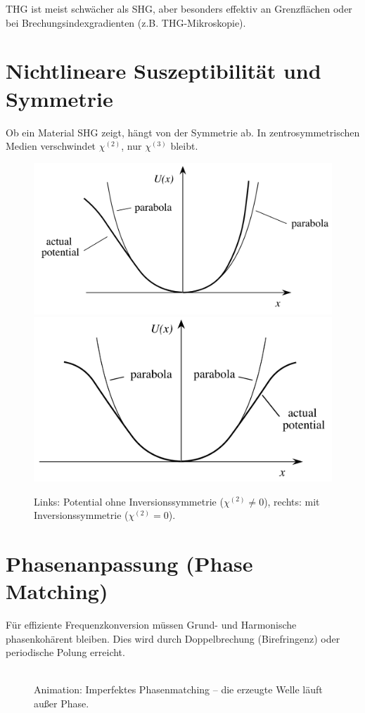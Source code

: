 \documentclass[9pt,a4paper,twocolumn,twoside]{tau-class/tau}
\begin{document}
THG ist meist schwächer als SHG, aber besonders effektiv an Grenzflächen oder bei Brechungsindexgradienten (z.B. THG-Mikroskopie).


\section{Nichtlineare Suszeptibilität und Symmetrie}
Ob ein Material SHG zeigt, hängt von der Symmetrie ab. In zentrosymmetrischen Medien verschwindet $\chi^{(2)}$, nur $\chi^{(3)}$ bleibt.

\begin{figure}[!ht]
\centering
\includegraphics[width=0.45\columnwidth]{../praes/Images/pot_noncentrosym.png}
\includegraphics[width=0.45\columnwidth]{../praes/Images/pot_centrosym.png}
\caption{Links: Potential ohne Inversionssymmetrie ($\chi^{(2)} \neq 0$), rechts: mit Inversionssymmetrie ($\chi^{(2)} = 0$).\cite{Boyd2020}}
\end{figure}


\section{Phasenanpassung (Phase Matching)}
Für effiziente Frequenzkonversion müssen Grund- und Harmonische phasenkohärent bleiben. Dies wird durch Doppelbrechung (Birefringenz) oder periodische Polung erreicht.

\begin{figure}[!ht]
\centering
      \\[-1mm]{Animation: Imperfektes Phasenmatching – die erzeugte Welle läuft außer Phase.}
    \cite{Bertolotti2019b}
\end{figure}
\end{document}
